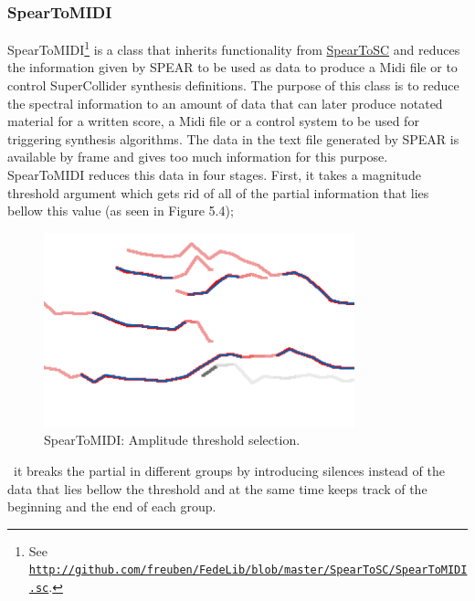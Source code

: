 \subsubsection{SpearToMIDI}
\hypertarget{spearmidi}{}

SpearToMIDI\footnote{See \href{http://github.com/freuben/FedeLib/blob/master/SpearToSC/SpearToMIDI.sc}{\texttt{http://github.com/freuben/FedeLib/blob/master/SpearToSC/SpearToMIDI.sc}}.} is a class that inherits functionality from \hyperlink{spearsc}{SpearToSC} and reduces the information given by SPEAR to be used as data to produce a Midi file or to control SuperCollider synthesis definitions. The purpose of this class is to reduce the spectral information to an amount of data that can later produce notated material for a written score, a Midi file or a control system to be used for triggering synthesis algorithms. The data in the text file generated by SPEAR is available by frame and gives too much information for this purpose. SpearToMIDI reduces this data in four stages. First, it takes a magnitude threshold argument which gets rid of all of the partial information that lies bellow this value (as seen in Figure 5.4);
\begin{figure}[htbp] %
   \centering
   \includegraphics[width=9cm]{chapter5/Spear2.tif} %
   \caption{SpearToMIDI: Amplitude threshold selection.}
   \label{fig:example}
\end{figure}\
it breaks the partial in different groups by introducing silences instead of the data that lies bellow the threshold and at the same time keeps track of the beginning and the end of each group. 

